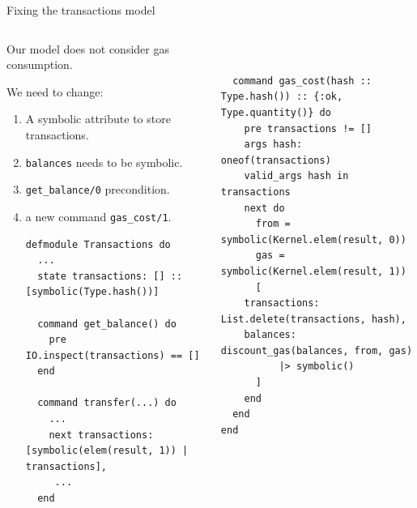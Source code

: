 \documentclass[aspectratio=169, 10pt]{beamer}
\begin{document}
\begin{frame}[label={sec:org226cd63},fragile]{Fixing the transactions model}
 \begin{columns}
\begin{column}{0.48\columnwidth}
Our model does not consider gas consumption.

\vspace{10pt}

We need to change:
\begin{enumerate}
\item A symbolic attribute to store transactions.
\item \texttt{balances} needs to be symbolic.
\item \texttt{get\_balance/0} precondition.
\item a new command \texttt{gas\_cost/1}.

\lstset{language=elixir,label= ,caption= ,captionpos=b,numbers=none,style=display}
\begin{lstlisting}
defmodule Transactions do
  ...   
  state transactions: [] :: [symbolic(Type.hash())]

  command get_balance() do
    pre IO.inspect(transactions) == []
  end

  command transfer(...) do
    ...
    next transactions: [symbolic(elem(result, 1)) | transactions],
	 ...   
  end
\end{lstlisting}
\end{enumerate}
\end{column}

\begin{column}{0.48\columnwidth}
\lstset{language=elixir,label= ,caption= ,captionpos=b,numbers=none,style=display}
\begin{lstlisting}


  command gas_cost(hash :: Type.hash()) :: {:ok, Type.quantity()} do
    pre transactions != []
    args hash: oneof(transactions)
    valid_args hash in transactions
    next do
      from = symbolic(Kernel.elem(result, 0))
      gas = symbolic(Kernel.elem(result, 1))
      [
	transactions: List.delete(transactions, hash),
	balances: discount_gas(balances, from, gas)
		  |> symbolic()
      ]
    end
  end
end



\end{lstlisting}
\end{column}
\end{columns}
\end{frame}
\end{document}
